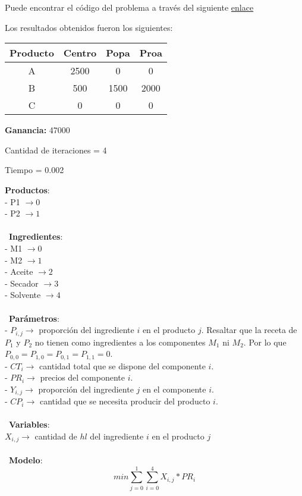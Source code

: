 \documentclass[titlepage, 11pt]{scrartcl}
\begin{document}
{\begin{description}
   			Puede encontrar el c\'odigo del problema a trav\'es del siguiente \href{lab1ex1.py}{enlace}
   			
   			Los resultados obtenidos fueron los siguientes:
   			\begin{center}
   				\begin{tabular}{| c | c | c | c |}
   					\hline
   					Producto & Centro & Popa &Proa\\ \hline
   					A & 2500 & 0 & 0 \\
   					B & 500 & 1500 & 2000 \\
   					C & 0 & 0 & 0 \\ \hline
   				\end{tabular}	
   			\end{center}
   			
			\textbf{Ganancia: } 47000
			
			Cantidad de iteraciones = 4

			Tiempo = 0.002
    		
    		
    		\item[3] 
    		
    		\textbf{Productos}:\\
    		- P1 $\rightarrow 0$\\
    		- P2 $\rightarrow 1$\\
    		\\\
    		\textbf{Ingredientes}:\\
    		- M1 $\rightarrow 0$\\
    		- M2 $\rightarrow 1$\\
    		- Aceite $\rightarrow 2$\\
    		- Secador $\rightarrow 3$\\
    		- Solvente $\rightarrow 4$\\
    		\\\
    		\textbf{Parámetros}:\\
    		- $P_{i, j} \rightarrow$ proporción del ingrediente $i$ en el producto $j$. Resaltar que la receta de $P_1$ y $P_2$ no tienen como ingredientes a los componentes $M_1$ ni $M_2$. Por lo que $P_{0, 0}= P_{1, 0} = P_{0, 1} = P_{1, 1} = 0$.\\
    		- $CT_i \rightarrow$ cantidad total que se dispone del componente $i$.\\
    		- $PR_i \rightarrow$ precios del componente $i$.\\
    		- $Y_{i, j} \rightarrow$ proporción del ingrediente $j$ en el componente $i$.\\
    		- $CP_i \rightarrow$ cantidad que se necesita producir del producto $i$.\\
    		\\\
    		\textbf{Variables}:\\
    		$X_{i,j} \rightarrow$ cantidad de $hl$ del ingrediente $i$ en el producto $j$\\
    		\\\
    		\textbf{Modelo}:\\
    		$$min\sum_{j=0}^{1}\sum_{i=0}^{4}X_{i, j} * PR_{i}$$\\
    		

\end{description}}
\end{document}
